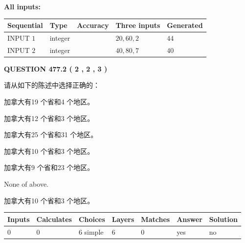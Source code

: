 \documentclass{ctexart}
\begin{document}
   
   
   
\noindent\vspace{0.1in}\hspace{-0.08in} {\textbf{\Large{All inputs: }}}
   
   
  
  
\noindent\begin{tabular}{|l|l|l|l|l|}
\hline
 Sequential & Type & Accuracy & Three inputs & Generated \\ 
\hline
 
 
  INPUT $  1 $ & integer &  & $
 20
 , 
 60
 , 
 2
 $ & $ 44 $ 
 \\  \hline  
 
 
  INPUT $  2 $ & integer &  & $
 40
 , 
 80
 , 
 7
 $ & $ 40 $ 
 \\  \hline  
 \end{tabular}
   
   
  
\vspace{0.2in}
  
{\textbf{\Large{QUESTION
477.2 
 ( 2 , 2 , 3 )
}}}
  
  
请从如下的陈述中选择正确的：
 
 
加拿大有19 个省和4 个地区。
 
 
加拿大有12 个省和3 个地区。
 
 
加拿大有25 个省和31 个地区。
 
 
加拿大有10 个省和3 个地区。
 
 
加拿大有9 个省和23 个地区。
 
 
 None of above.
 
 
\noindent{}
 
 
加拿大有10 个省和3 个地区。
 
 
\noindent{}
 
 
   
   
   
   
\noindent\begin{tabular}{|l|l|l|l|l|l|l|}
 \hline
Inputs & Calculates & Choices & Layers & Matches & Answer & Solution \\ \hline
 0  & 
 0  & 
 6
  simple  
  & 
 6  & 
 0  & 
  yes & 
  no 
  \\ \hline
 \end{tabular}
   
\end{document}
